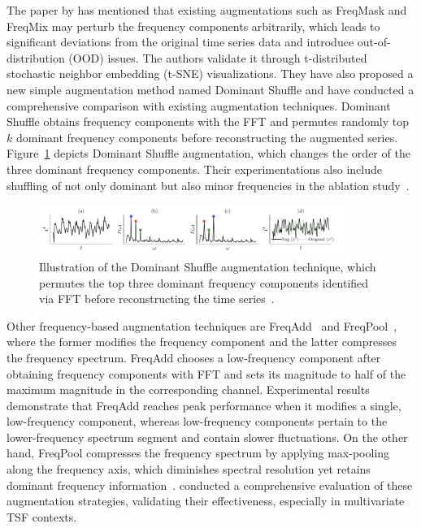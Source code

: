 The paper by \cite{zhao2024dominantshufflesimplepowerful}  has mentioned that existing augmentations such as FreqMask and FreqMix may perturb the frequency components arbitrarily, which leads to significant deviations from the original time series data and introduce out-of-distribution (OOD) issues. The authors validate it through t-distributed stochastic neighbor embedding (t-SNE) visualizations. They have also proposed a new simple augmentation method named Dominant Shuffle and have conducted a comprehensive comparison with existing augmentation techniques. Dominant Shuffle obtains frequency components with the FFT and permutes randomly top $k$  dominant frequency components before reconstructing the augmented series. Figure~\ref{fig:domshuffle} depicts Dominant Shuffle augmentation, which changes the order of the three dominant frequency components. Their experimentations also include shuffling of not only dominant but also minor frequencies in the ablation study~\cite{zhao2024dominantshufflesimplepowerful}. 









\begin{figure}[h!]
    \centering
    \includegraphics[page=1, width=0.9\textwidth]{./images/domshuffle.pdf}
    \caption{Illustration of the Dominant Shuffle augmentation technique, which permutes the top three dominant frequency components identified via FFT before reconstructing the time series~\cite{zhao2024dominantshufflesimplepowerful}.}
    \label{fig:domshuffle}
\end{figure}



Other frequency-based augmentation techniques are FreqAdd~\cite{freqadd} and FreqPool~\cite{freqpool}, where the former modifies the frequency component and the latter compresses the frequency spectrum. FreqAdd chooses a low-frequency component after obtaining frequency components with FFT and sets its magnitude to half of the maximum magnitude in the corresponding channel. Experimental results demonstrate that FreqAdd reaches peak performance when it modifies a single, low-frequency component, whereas low-frequency components pertain to the lower-frequency spectrum segment and contain slower fluctuations. On the other hand, FreqPool compresses the frequency spectrum by applying max-pooling along the frequency axis, which diminishes spectral resolution yet retains dominant frequency information~\cite{freqadd, freqpool}. \cite{zhao2024dominantshufflesimplepowerful} conducted a comprehensive evaluation of these augmentation strategies, validating their effectiveness, especially in multivariate TSF contexts.



